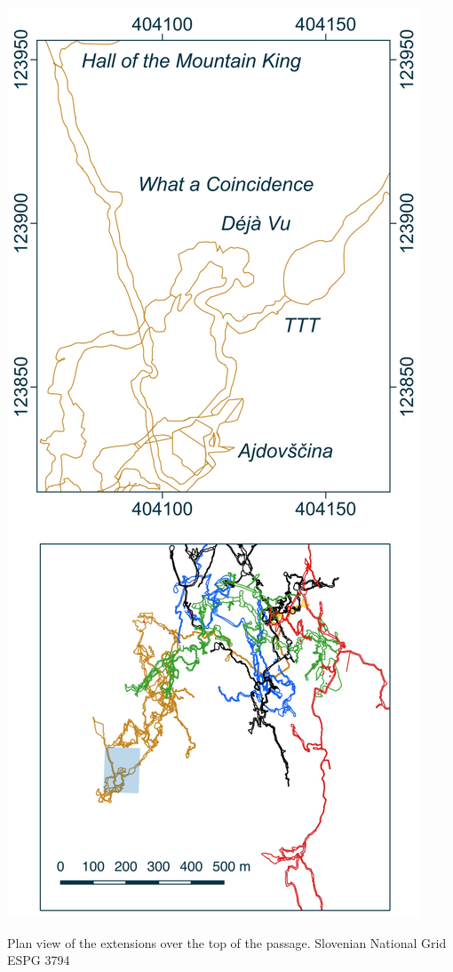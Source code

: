 \begin{marginsurvey}
\checkoddpage \ifoddpage \forcerectofloat \else \forceversofloat \fi
\centering
 \includegraphics[width=\linewidth]{images/little_insets/djvu_inset.pdf}
 \caption[Adjov\v{s}\v{c}ina pitch]{Plan view of the \protect{} extensions over the top of the \protect{} passage. Slovenian National Grid ESPG 3794}
 \label{Déjà Vu inset}
\end{marginsurvey}

